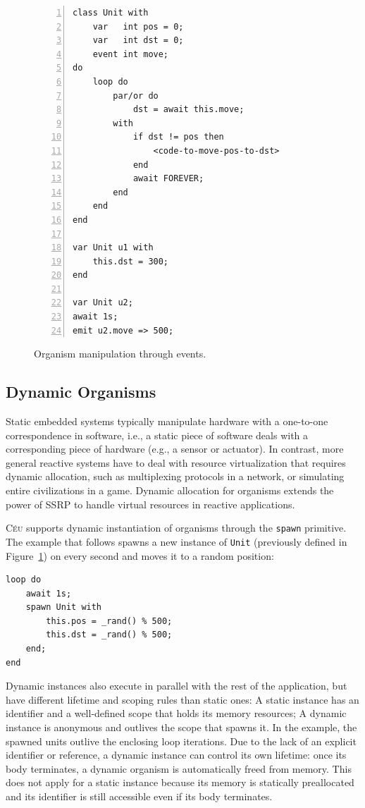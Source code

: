 \documentclass{sigplanconf}
\newcommand{\CEU}{\textsc{C\'{e}u}\xspace}
\newcommand{\code}[1] {{\small{\texttt{#1}}}}
\newcommand{\1}{\;}
\newcommand{\2}{\;\;}
\newcommand{\3}{\;\;\;}
\newcommand{\5}{\;\;\;\;\;}
\begin{document}
\begin{figure}%
\begin{lstlisting}[numbers=left,xleftmargin=3em]
class Unit with
    var   int pos = 0;
    var   int dst = 0;
    event int move;
do
    loop do
        par/or do
            dst = await this.move;
        with
            if dst != pos then
                <code-to-move-pos-to-dst>
            end
            await FOREVER;
        end
    end
end

var Unit u1 with
    this.dst = 300;
end

var Unit u2;
await 1s;
emit u2.move => 500;
\end{lstlisting}
\caption{ Organism manipulation through events.
\label{lst.unit}
}
\end{figure}

\subsection{Dynamic Organisms}
\label{sec.orgs.dyn}

Static embedded systems typically manipulate hardware with a one-to-one 
correspondence in software, i.e., a static piece of software deals with a 
corresponding piece of hardware (e.g., a sensor or actuator).
%
In contrast, more general reactive systems have to deal with resource 
virtualization that requires dynamic allocation, such as multiplexing protocols 
in a network, or simulating entire civilizations in a game.
%
Dynamic allocation for organisms extends the power of SSRP to handle virtual 
resources in reactive applications.

\CEU supports dynamic instantiation of organisms through the \code{spawn} 
primitive.
The example that follows spawns a new instance of \code{Unit} (previously 
defined in Figure~\ref{lst.unit}) on every second and moves it to a random 
position:

\begin{lstlisting}
loop do
    await 1s;
    spawn Unit with
        this.pos = _rand() % 500;
        this.dst = _rand() % 500;
    end;
end
\end{lstlisting}


Dynamic instances also execute in parallel with the rest of the application, 
but have different lifetime and scoping rules than static ones:
%
A static instance has an identifier and a well-defined scope that holds its 
memory resources;
A dynamic instance is anonymous and outlives the scope that spawns it.
In the example, the spawned units outlive the enclosing loop iterations.
%
Due to the lack of an explicit identifier or reference, a dynamic instance can 
control its own lifetime:
once its body terminates, a dynamic organism is automatically freed from 
memory.
%
This does not apply for a static instance because its memory is statically 
preallocated and its identifier is still accessible even if its body 
terminates.
\end{document}
